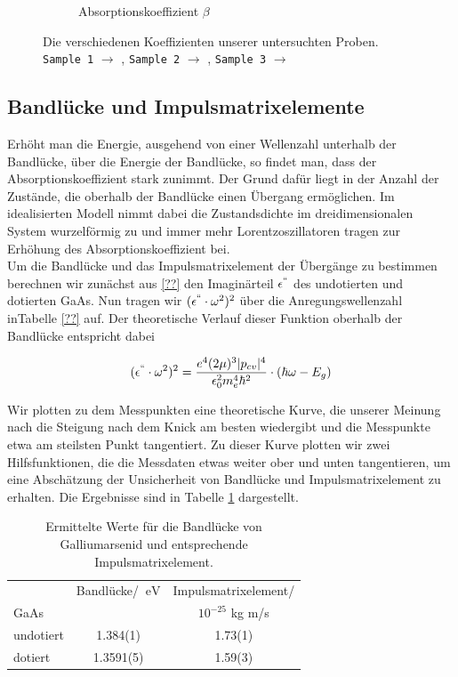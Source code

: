 \documentclass[paper=a4,fontsize=10pt,DIV=18,twocolumn,parskip=half]{scrartcl}
\numberwithin{equation}{section}    %
\begin{document}
\begin{figure}
\begin{subfigure}{\columnwidth}
        \caption{Absorptionskoeffizient $\beta$}
        \label{ab}
    \end{subfigure}
    \caption{Die verschiedenen Koeffizienten unserer untersuchten Proben.  
    \texttt{Sample 1} $\rightarrow$ ,
    \texttt{Sample 2} $\rightarrow$ , 
    \texttt{Sample 3} $\rightarrow$ }
    \label{brechzahlen}
\end{figure}

\subsection{Bandlücke und Impulsmatrixelemente}

Erhöht man die Energie, ausgehend von einer Wellenzahl unterhalb der Bandlücke, 
über die Energie der Bandlücke, so findet man, dass der Absorptionskoeffizient 
stark zunimmt. Der Grund dafür liegt in der Anzahl der Zustände, die oberhalb 
der Bandlücke einen Übergang ermöglichen. Im idealisierten Modell nimmt dabei 
die Zustandsdichte im dreidimensionalen System wurzelförmig zu und immer mehr 
Lorentzoszillatoren tragen zur Erhöhung des Absorptionskoeffizient bei.\\
Um die Bandlücke und das Impulsmatrixelement der Übergänge zu bestimmen 
berechnen wir zunächst aus \cref{??} den Imaginärteil $\epsilon^{``}$ des 
undotierten und dotierten GaAs. Nun tragen wir $(\epsilon^{``}\cdot \omega^2)^2$ 
über die Anregungswellenzahl inTabelle \ref{??} auf. Der theoretische Verlauf 
dieser Funktion oberhalb der Bandlücke entspricht dabei

\begin{align}
   (\epsilon^{``}\cdot \omega^2)^2=\frac{e^4 (2\mu)^3 |p_{cv}|^4}{\epsilon_0^2 
   m_e^4 \hbar^2} \cdot (\hbar \omega - E_g)
\end{align}

Wir plotten zu dem Messpunkten eine theoretische Kurve, die unserer Meinung nach 
die Steigung nach dem Knick am besten wiedergibt und die Messpunkte etwa am 
steilsten Punkt tangentiert. Zu dieser Kurve plotten wir zwei Hilfsfunktionen, 
die die Messdaten etwas weiter ober und unten tangentieren, um eine Abschätzung 
der Unsicherheit von Bandlücke und Impulsmatrixelement zu erhalten.
Die Ergebnisse sind in Tabelle \ref{ime} dargestellt.

\begin{table}
    \begin{center}
\begin{tabular}[r]{ l | c c }
            &Bandlücke/ $\SI{}{\eV}	$		&Impulsmatrixelement/\\
  GaAs &  & $10^{-25}$ kg m/s\\
  \hline
  undotiert & 1.384(1) & 1.73(1) \\
 dotiert & 1.3591(5) & 1.59(3)   \end{tabular}
\caption{Ermittelte Werte für die Bandlücke von Galliumarsenid und entsprechende 
Impulsmatrixelement.}
  \label{ime}  \end{center}
\end{table}
\end{document}
